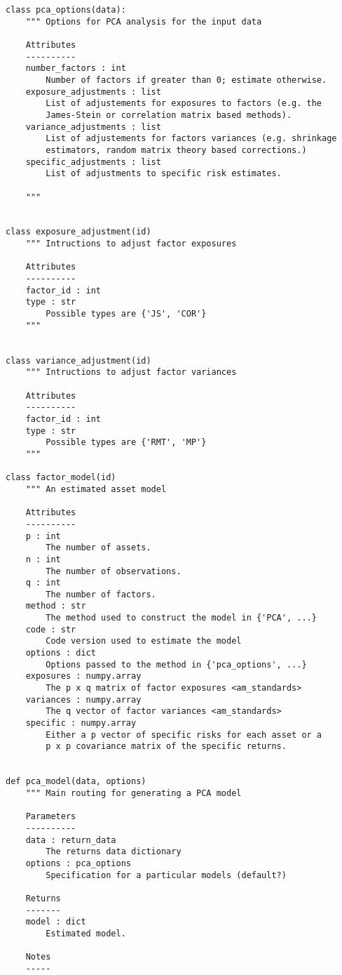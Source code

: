\documentclass[leqno,12pt]{article}
\begin{document}
{\begin{verbatim}
class pca_options(data):
    """ Options for PCA analysis for the input data
	
    Attributes
    ----------
    number_factors : int
        Number of factors if greater than 0; estimate otherwise.
    exposure_adjustments : list
        List of adjustements for exposures to factors (e.g. the
        James-Stein or correlation matrix based methods).
    variance_adjustments : list
        List of adjustements for factors variances (e.g. shrinkage
        estimators, random matrix theory based corrections.)
    specific_adjustments : list
        List of adjustments to specific risk estimates.
	
    """


class exposure_adjustment(id)
    """ Intructions to adjust factor exposures 

    Attributes
    ----------
    factor_id : int
    type : str
        Possible types are {'JS', 'COR'}
    """


class variance_adjustment(id)
    """ Intructions to adjust factor variances

    Attributes
    ----------
    factor_id : int
    type : str
        Possible types are {'RMT', 'MP'}
    """

class factor_model(id)
    """ An estimated asset model

    Attributes
    ----------
    p : int
        The number of assets.
    n : int
        The number of observations.
    q : int
        The number of factors. 
    method : str
        The method used to construct the model in {'PCA', ...}
    code : str
        Code version used to estimate the model
    options : dict
        Options passed to the method in {'pca_options', ...}
    exposures : numpy.array
        The p x q matrix of factor exposures <am_standards>
    variances : numpy.array
        The q vector of factor variances <am_standards>
    specific : numpy.array
        Either a p vector of specific risks for each asset or a
        p x p covariance matrix of the specific returns.


def pca_model(data, options)
	""" Main routing for generating a PCA model 

    Parameters
    ----------
    data : return_data
        The returns data dictionary
    options : pca_options
        Specification for a particular models (default?)
	
    Returns
    -------
    model : dict
        Estimated model.

    Notes
    -----
	

\end{verbatim}}
\end{document}
